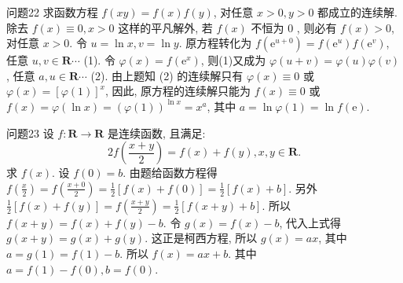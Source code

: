 问题22 求函数方程 $f(x y)=f(x) f(y)$, 对任意 $x>0, y>0$ 都成立的连续解.
除去 $f(x) \equiv 0, x>0$ 这样的平凡解外, 若 $f(x)$ 不恒为 0 , 则必有 $f(x)>0$, 对任意 $x>0$. 令 $u=\ln x, v=\ln y$. 原方程转化为 $f\left(\mathrm{e}^{u+0}\right)= f\left(\mathrm{e}^u\right) f\left(\mathrm{e}^v\right)$, 任意 $u, v \in \mathbf{R} \cdots$ (1). 令 $\varphi(x)=f\left(\mathrm{e}^x\right)$, 则(1)又成为 $\varphi(u+v)= \varphi(u) \varphi(v)$, 任意 $a, u \in \mathbf{R} \cdots$ (2). 
由上题知 (2) 的连续解只有 $\varphi(x) \equiv 0$ 或 $\varphi(x)=[\varphi(1)]^x$, 因此, 原方程的连续解只能为 $f(x) \equiv 0$ 或 $f(x)=\varphi(\ln x)=(\varphi(1))^{\ln x}=x^a$, 其中 $a=\ln \varphi(1)=\ln f(\mathrm{e})$.



问题23 设 $f: \mathbf{R} \rightarrow \mathbf{R}$ 是连续函数, 且满足:
$$
2 f\left(\frac{x+y}{2}\right)=f(x)+f(y), x, y \in \mathbf{R} .
$$
求 $f(x)$.
设 $f(0)=b$. 由题给函数方程得 $f\left(\frac{x}{2}\right)=f\left(\frac{x+0}{2}\right)=\frac{1}{2}[f(x)+ f(0)]=\frac{1}{2}[f(x)+b]$. 另外 $\frac{1}{2}[f(x)+f(y)]=f\left(\frac{x+y}{2}\right)=\frac{1}{2}[f(x+ y)+b]$. 所以 $f(x+y)=f(x)+f(y)-b$. 
令 $g(x)=f(x)-b$, 代入上式得 $g(x+y)=g(x)+g(y)$. 这正是柯西方程, 所以 $g(x)=a x$, 其中 $a= g(1)=f(1)-b$. 所以 $f(x)=a x+b$. 其中 $a=f(1)-f(0), b=f(0)$.



